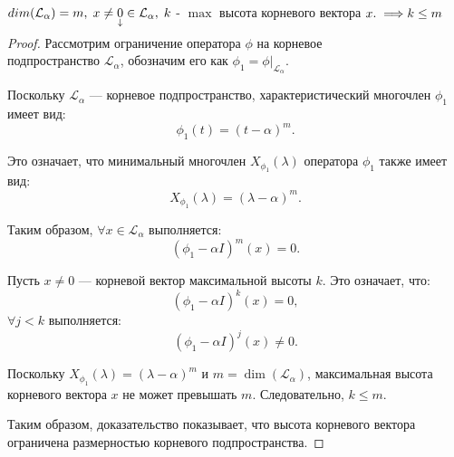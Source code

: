 \vspace{0.3cm}
\begin{shth}
    \begin{theorem} 
        \leavevmode \nl 
        
        \(dim(\mathcal{L}_{\alpha}) = m, \; x \neq \smash{\underset{\downarrow} {0}} \in \mathcal{L}_{\alpha}, \; k \) - $ \max $ высота  корневого вектора \(x.\; \Longrightarrow k \leq m\)
    \end{theorem}
\end{shth}


\begin{proof}
    Рассмотрим ограничение оператора \( \phi \) на корневое \\ подпространство \( \mathcal{L}_{\alpha} \), обозначим его как \( \phi_1 = \phi|_{\mathcal{L}_{\alpha}} \). 

    Поскольку \( \mathcal{L}_{\alpha} \) — корневое подпространство, характеристический многочлен \( \phi_1 \) имеет вид:
    \[
    \phi_1(t) = (t - \alpha)^m.
    \]

    Это означает, что минимальный многочлен \( X_{\phi_1}(\lambda) \) оператора \( \phi_1 \) также имеет вид:
    \[
    X_{\phi_1}(\lambda) = (\lambda - \alpha)^m.
    \]

    Таким образом, \(\forall x \in \mathcal{L}_{\alpha} \) выполняется:
    \[
    (\phi_1 - \alpha I)^m(x) = 0.
    \]

    Пусть \( x \neq 0 \) — корневой вектор максимальной высоты \( k \). Это означает, что:
    \[
    (\phi_1 - \alpha I)^k(x) = 0,
    \]
    \(\forall j < k \) выполняется:
    \[
    (\phi_1 - \alpha I)^j(x) \neq 0.
    \]

    Поскольку \( X_{\phi_1}(\lambda) = (\lambda - \alpha)^m \) и \( m = \dim(\mathcal{L}_{\alpha}) \), максимальная высота корневого вектора \( x \) не может превышать \( m \). Следовательно, \( k \leq m \). 
    
    Таким образом, доказательство показывает, что высота корневого вектора \\ ограничена размерностью корневого подпространства.
\end{proof}

